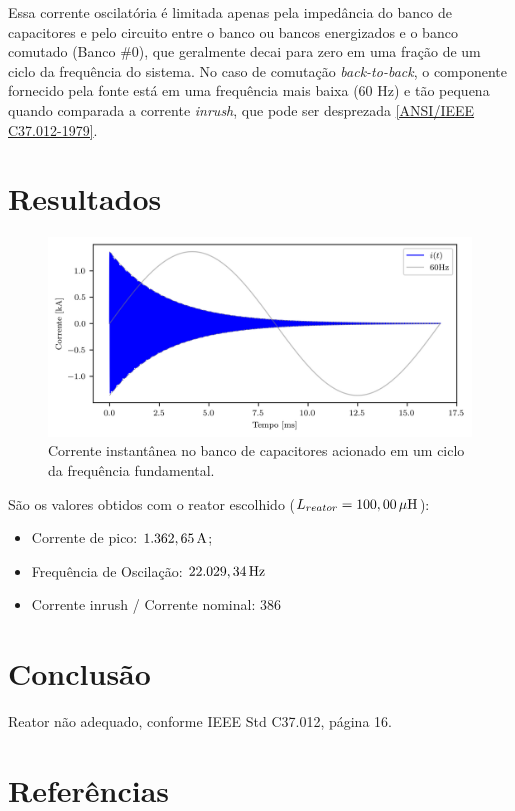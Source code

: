 \documentclass[a4paper]{article}
\begin{document}
Essa corrente oscilatória é limitada apenas pela impedância do banco de capacitores e pelo circuito entre o banco ou bancos energizados e o banco comutado (Banco \#0), que geralmente decai para zero em uma fração de um ciclo da frequência do sistema. No caso de comutação \textit{back-to-back}, o componente fornecido pela fonte está em uma frequência mais baixa (60 Hz) e tão pequena quando comparada a corrente \textit{inrush}, que pode ser desprezada \href{https://ieeexplore.ieee.org/document/7035261}{[ANSI/IEEE C37.012-1979]}.



\section{Resultados}
\begin{figure}[!hbp]
	\centering
	\includegraphics{figs/Correntes.png}
	\caption{Corrente instantânea no banco de capacitores acionado em um ciclo da frequência fundamental.}
	\label{fig:picture2}
\end{figure}

São os valores obtidos com o reator escolhido ($L_{reator} = 100,00 \, \mu \rm{H} $):
\begin{itemize}[label=\textendash]
	\item	Corrente de pico: $1.362,65 \, \rm{A}$;
	\item	Frequência de Oscilação: $22.029,34 \, \rm{Hz}$
	\item	Corrente inrush / Corrente nominal: $386$
\end{itemize}

\section{Conclusão}
Reator n\~{a}o adequado, conforme IEEE Std C37.012, p\'{a}gina 16.

\section{Referências}
\end{document}
